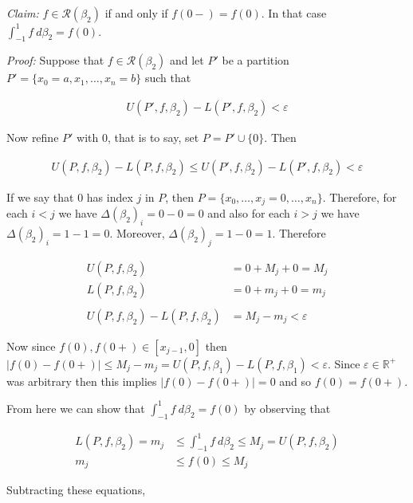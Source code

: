 \documentclass{article}
\begin{document}
  \vspace{1cm}

  {\it Claim:}  $f\in\mathscr R(\beta_2)$ if and only if $f(0-)=f(0)$.  In that case $\int_{-1}^1 f \ d\beta_2 = f(0)$.

  \vspace{1cm}

  {\it Proof:} Suppose that $f\in\mathscr R(\beta_2)$ and let $P'$ be a partition $P'=\{x_0=a,x_1,\dots,x_n=b\}$ such that

  \begin{align*}
    U(P',f,\beta_2)-L(P',f,\beta_2)<\varepsilon
  \end{align*}

  Now refine $P'$ with $0$, that is to say, set $P=P'\cup\{0\}$.  Then

  \begin{align*}
    U(P,f,\beta_2)-L(P,f,\beta_2)\leq U(P',f,\beta_2)-L(P',f,\beta_2)<\varepsilon
  \end{align*}

  If we say that $0$ has index $j$ in $P$, then $P=\{x_0,\dots,x_j=0,\dots,x_n\}$.  Therefore, for each $i < j$ we have $\Delta(\beta_2)_i = 0-0=0$ and also for each $i>j$ we have $\Delta(\beta_2)_i = 1-1 = 0$.  Moreover, $\Delta(\beta_2)_{j}=1-0=1$.  Therefore

  \begin{align*}
    U(P,f,\beta_2)&=0+M_{j}+0=M_{j}\\
    L(P,f,\beta_2)&=0+m_{j}+0=m_{j}\\\\
    U(P,f,\beta_2)-L(P,f,\beta_2) &= M_{j}-m_{j}<\varepsilon
  \end{align*}

  Now since $f(0),f(0+) \in [x_{j-1},0]$ then $|f(0)-f(0+)|\leq M_{j}-m_j = U(P,f,\beta_1)-L(P,f,\beta_1)< \varepsilon$.  Since $\varepsilon\in\mathbb R^+$ was arbitrary then this implies $|f(0)-f(0+)|=0$ and so $f(0)=f(0+)$.  

  \vspace{1cm}

  From here we can show that $\int_{-1}^1 f \ d\beta_2 = f(0)$ by observing that

  \begin{align*}
    L(P,f,\beta_2)=m_{j}&\leq \int_{-1}^1 f \ d\beta_2 \leq M_{j}=U(P,f,\beta_2)\\
    m_{j}&\leq f(0)\leq M_{j}
  \end{align*}

  Subtracting these equations,
\end{document}
